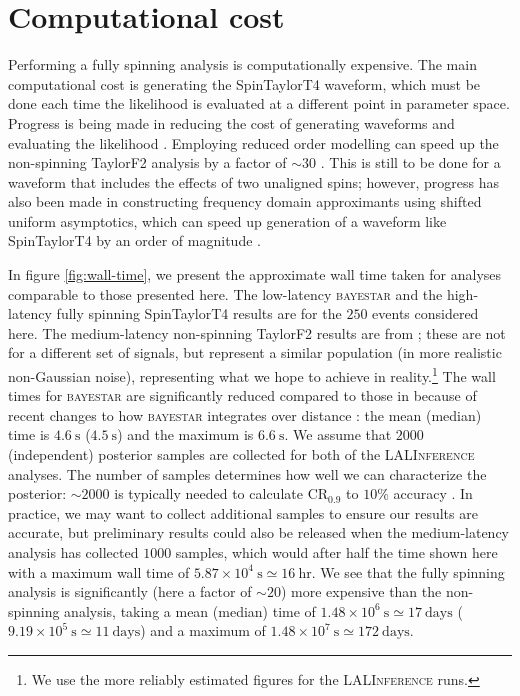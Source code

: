 \appendix

\section{Computational cost}\label{ap:CPU}

Performing a fully spinning analysis is computationally expensive. The main computational cost is generating the SpinTaylorT4 waveform, which must be done each time the likelihood is evaluated at a different point in parameter space. Progress is being made in reducing the cost of generating waveforms and evaluating the likelihood \citep[e.g.,][]{Canizares_2013,P_rrer_2014}. Employing reduced order modelling can speed up the non-spinning TaylorF2 analysis by a factor of $\sim 30$ \citep{Canizares_2015}. This is still to be done for a waveform that includes the effects of two unaligned spins; however, progress has also been made in constructing frequency domain approximants using shifted uniform asymptotics, which can speed up generation of a waveform like SpinTaylorT4 by an order of magnitude \citep{Klein:2014bua}.

In figure \ref{fig:wall-time}, we present the approximate wall time taken for analyses comparable to those presented here. The low-latency \textsc{bayestar} and the high-latency fully spinning SpinTaylorT4 results are for the $250$ events considered here. The medium-latency non-spinning TaylorF2 results are from \citet{Berry_2014}; these are not for a different set of signals, but represent a similar population (in more realistic non-Gaussian noise), representing what we hope to achieve in reality.\footnote{We use the more reliably estimated figures for the \textsc{LALInference} runs.} The wall times for \textsc{bayestar} are significantly reduced compared to those in \citet{Berry_2014} because of recent changes to how \textsc{bayestar} integrates over distance \citep{Singer:2015ema}: the mean (median) time is $4.6~\mathrm{s}$ ($4.5~\mathrm{s}$) and the maximum is $6.6~\mathrm{s}$.  We assume that $2000$ (independent) posterior samples are collected for both of the \textsc{LALInference} analyses. The number of samples determines how well we can characterize the posterior: $\sim2000$ is typically needed to calculate $\mathrm{CR}_{0.9}$ to $10\%$ accuracy \citep{DelPozzo_2015}. In practice, we may want to collect additional samples to ensure our results are accurate, but preliminary results could also be released when the medium-latency analysis has collected $1000$ samples, which would after half the time shown here with a maximum wall time of $5.87\times10^4~\mathrm{s} \simeq 16~\mathrm{hr}$. We see that the fully spinning analysis is significantly (here a factor of $\sim20$) more expensive than the non-spinning analysis, taking a mean (median) time of $1.48\times10^6~\mathrm{s} \simeq 17~\mathrm{days}$ ($9.19\times10^5~\mathrm{s} \simeq 11~\mathrm{days}$) and a maximum of $1.48\times10^7~\mathrm{s} \simeq 172~\mathrm{days}$.

